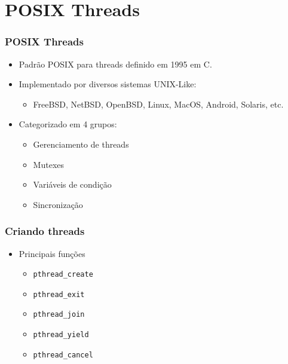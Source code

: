 \documentclass[xcolor=dvipsnames,11pt,presentation,aspectratio=169]{beamer}
\begin{document}
\section{POSIX Threads}
\begin{frame}
  \frametitle{POSIX Threads}
  \begin{itemize}
  \item Padrão POSIX para threads definido em 1995 em C.
  \item Implementado por diversos sistemas UNIX-Like:
    \begin{itemize}
      \item FreeBSD, NetBSD, OpenBSD, Linux, MacOS, Android, Solaris, etc.
      \end{itemize}
  \item Categorizado em 4 grupos:
    \begin{itemize}
      \item Gerenciamento de threads
      \item Mutexes
      \item Variáveis de condição
      \item Sincronização
    \end{itemize}      
  \end{itemize}
\end{frame}
\begin{frame}
  \frametitle{Criando threads}
  \begin{itemize}
  \item Principais funções
    \begin{itemize}
      \item \texttt{pthread\_create}
      \item \texttt{pthread\_exit}
      \item \texttt{pthread\_join}
      \item \texttt{pthread\_yield}
      \item \texttt{pthread\_cancel}
    \end{itemize}      
  \end{itemize}
\end{frame}
\end{document}
